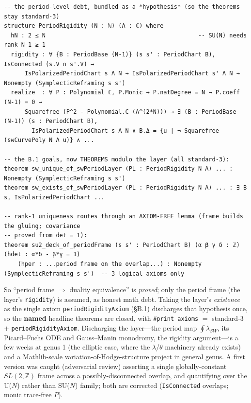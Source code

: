 \documentclass{article}
\theoremstyle{plain}
\theoremstyle{definition}
\numberwithin{equation}{section}
\newcommand{\code}[1]{\texttt{#1}}
\begin{document}
\begin{Verbatim}
-- the period-level debt, bundled as a *hypothesis* (so the theorems stay standard-3)
structure PeriodRigidity (N : ℕ) (Λ : ℂ) where
  hN : 2 ≤ N                                            -- SU(N) needs rank N-1 ≥ 1
  rigidity : ∀ {B : PeriodBase (N-1)} (s s' : PeriodChart B), IsConnected (s.V ∩ s'.V) →
      IsPolarizedPeriodChart s Λ N → IsPolarizedPeriodChart s' Λ N → Nonempty (SymplecticReframing s s')
  realize  : ∀ P : Polynomial ℂ, P.Monic → P.natDegree = N → P.coeff (N-1) = 0 →
      Squarefree (P^2 - Polynomial.C (Λ^(2*N))) → ∃ (B : PeriodBase (N-1)) (s : PeriodChart B),
        IsPolarizedPeriodChart s Λ N ∧ B.Δ = {u | ¬ Squarefree (swCurvePoly N Λ u)} ∧ ...

-- the B.1 goals, now THEOREMS modulo the layer (all standard-3):
theorem sw_unique_of_swPeriodLayer (PL : PeriodRigidity N Λ) ... : Nonempty (SymplecticReframing s s')
theorem sw_exists_of_swPeriodLayer (PL : PeriodRigidity N Λ) ... : ∃ B s, IsPolarizedPeriodChart ...

-- rank-1 uniqueness routes through an AXIOM-FREE lemma (frame builds the gluing; covariance
-- proved from det = 1):
theorem su2_deck_of_periodFrame (s s' : PeriodChart B) (α β γ δ : ℤ) (hdet : α*δ - β*γ = 1)
    (hper : ...period frame on the overlap...) : Nonempty (SymplecticReframing s s')  -- 3 logical axioms only
\end{Verbatim}

\noindent So ``period frame $\Rightarrow$ duality equivalence'' is \emph{proved}; only the period
frame (the layer's \code{rigidity}) is assumed, as honest math debt. Taking the layer's
\emph{existence} as the single axiom \code{periodRigidityAxiom} (\S B.1) discharges that hypothesis once,
so the \textbf{named} headline theorems are closed, with \code{\#print axioms} $=$ standard-3 $+$
\code{periodRigidityAxiom}. Discharging the layer---the
period map $\oint \lambda_{SW}$, its Picard--Fuchs ODE and Gauss--Manin monodromy, the rigidity
argument---is a few weeks at genus 1 (the elliptic case, where the $\lambda$/$\theta$ machinery
already exists) and a Mathlib-scale variation-of-Hodge-structure project in general genus. A first
version was caught (adversarial review) asserting a single globally-constant $SL(2,\mathbb{Z})$
frame across a possibly-disconnected overlap, and quantifying over the U($N$) rather than SU($N$)
family; both are corrected (\code{IsConnected} overlaps; monic trace-free $P$).
\end{document}
